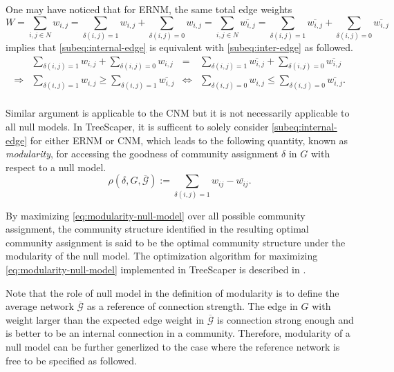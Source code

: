 \documentclass[11pt]{article}
\theoremstyle{definition}
\theoremstyle{definition}
\theoremstyle{definition}
\theoremstyle{remark}
\theoremstyle{plain}
\begin{document}
One may have noticed that for ERNM, the same total edge weights
\[
	W = \sum_{i,j\in N} w_{i,j} = \sum_{\delta(i,j) = 1} w_{i,j} + \sum_{\delta(i,j) = 0} w_{i,j}= \sum_{i,j\in N} \overline{w_{i,j}} = \sum_{\delta(i,j) = 1} \overline{w_{i,j}} + \sum_{\delta(i,j) = 0} \overline{w_{i,j}}
\] 
implies that \eqref{subeq:internal-edge} is equivalent with \eqref{subeq:inter-edge} as followed.
\[
	\begin{aligned}
		&\sum_{\delta(i,j) = 1} w_{i,j} + \sum_{\delta(i,j) = 0} w_{i,j}&= &\sum_{\delta(i,j) = 1} \overline{w_{i,j}} + \sum_{\delta(i,j) = 0} \overline{w_{i,j}}\\
		\Rightarrow& \sum_{\delta(i,j) = 1} w_{i,j} \geq \sum_{\delta(i,j) = 1} \overline{w_{i,j}} &\Leftrightarrow &\sum_{\delta(i,j) = 0} w_{i,j} \leq \sum_{\delta(i,j) = 0} \overline{w_{i,j}}.\\
	\end{aligned}
\]

Similar argument is applicable to the CNM but it is not necessarily applicable to all null models. In TreeScaper, it is sufficent to solely consider \eqref{subeq:internal-edge} for either ERNM or CNM, which leads to the following quantity, known as \emph{modularity},  for accessing the goodness of community assignment $\delta$ in $G$ with respect to a null model.
\begin{equation}\label{eq:modularity-null-model}
	\rho(\delta, G, \overline{\mathcal{G}}):=\sum_{\delta(i, j) = 1} w_{ij} - \overline{w_{ij}}.
\end{equation}

By maximizing \eqref{eq:modularity-null-model} over all possible community assignment, the community structure identified in the resulting optimal community assignment is said to be the optimal community structure under the modularity of the null model. The optimization algorithm for maximizing \eqref{eq:modularity-null-model} implemented in TreeScaper is described in \cite{traag2011narrow}.



Note that the role of null model in the definition of modularity is to define the average network $\overline{\mathcal{G}}$ as a reference of connection strength. The edge in $G$ with weight larger than the expected edge weight in $\overline{\mathcal{G}}$ is connection strong enough and is better to be an internal connection in a community. Therefore, modularity of a null model can be further generlized to the case where the reference network is free to be specified as followed.
\end{document}
